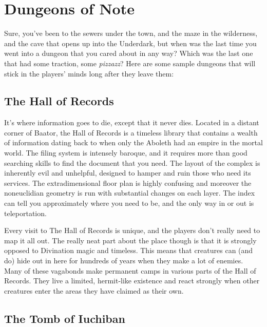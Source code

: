 
\chapter{Dungeons of Note}

Sure, you've been to the sewers under the town, and the maze in the wilderness, and the cave that opens up into the Underdark, but when was the last time you went into a dungeon that you cared about in any way? Which was the last one that had some traction, some \emph{pizzazz}? Here are some sample dungeons that will stick in the players' minds long after they leave them:

\section{The Hall of Records}

It's where information goes to die, except that it never dies. Located in a distant corner of Baator, the Hall of Records is a timeless library that contains a wealth of information dating back to when only the Aboleth had an empire in the mortal world. The filing system is intensely baroque, and it requires more than good searching skills to find the document that you need. The layout of the complex is inherently evil and unhelpful, designed to hamper and ruin those who need its services. The extradimensional floor plan is highly confusing and moreover the noneuclidian geometry is run with substantial changes on each layer. The index can tell you approximately where you need to be, and the only way in or out is teleportation.

Every visit to The Hall of Records is unique, and the players don't really need to map it all out. The really neat part about the place though is that it is strongly opposed to Divination magic and timeless. This means that creatures can (and do) hide out in here for hundreds of years when they make a lot of enemies. Many of these vagabonds make permanent camps in various parts of the Hall of Records. They live a limited, hermit-like existence and react strongly when other creatures enter the areas they have claimed as their own.

\section{The Tomb of Iuchiban}

